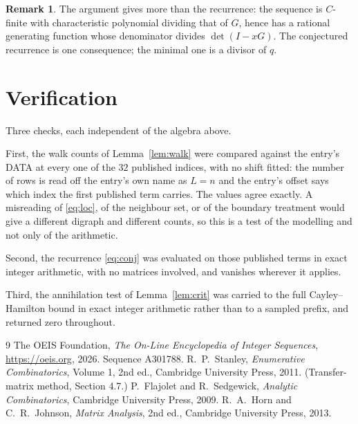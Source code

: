 \documentclass[11pt,a4paper]{article}
\theoremstyle{plain}
\theoremstyle{definition}
\newtheorem{remark}[theorem]{Remark}
\begin{document}
\begin{remark}
The argument gives more than the recurrence: the sequence is $C$-finite with characteristic
polynomial dividing that of $G$, hence has a rational generating function whose denominator
divides $\det(I-xG)$. The conjectured recurrence is one consequence; the minimal one is a
divisor of $q$.
\end{remark}

\section{Verification}

Three checks, each independent of the algebra above.

First, the walk counts of Lemma~\ref{lem:walk} were compared against the entry's DATA at
every one of the $32$ published indices, with no shift fitted: the number of rows is
read off the entry's own name as $L=n$ and the entry's offset says which index the first
published term carries. The values agree exactly. A misreading of \eqref{eq:loc}, of the
neighbour set, or of the boundary treatment would give a different digraph and different
counts, so this is a test of the modelling and not only of the arithmetic.

Second, the recurrence \eqref{eq:conj} was evaluated on those published terms in exact
integer arithmetic, with no matrices involved, and vanishes wherever it applies.

Third, the annihilation test of Lemma~\ref{lem:crit} was carried to the full
Cayley--Hamilton bound in exact integer arithmetic rather than to a sampled prefix, and
returned zero throughout.

\begin{thebibliography}{9}
 The OEIS Foundation, \emph{The On-Line Encyclopedia of Integer
Sequences}, \url{https://oeis.org}, 2026. Sequence A301788.
 R.~P.~Stanley, \emph{Enumerative Combinatorics}, Volume 1, 2nd ed.,
Cambridge University Press, 2011. (Transfer-matrix method, Section 4.7.)
 P.~Flajolet and R.~Sedgewick, \emph{Analytic Combinatorics}, Cambridge
University Press, 2009.
 R.~A.~Horn and C.~R.~Johnson, \emph{Matrix Analysis}, 2nd ed., Cambridge
University Press, 2013.
\end{thebibliography}
\end{document}
